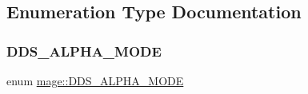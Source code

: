 \subsection{Enumeration Type Documentation}
\hypertarget{namespacemage_a0c586a2bad862f4858900ca121ca80c2}{}\label{namespacemage_a0c586a2bad862f4858900ca121ca80c2} 
\subsubsection{\texorpdfstring{D\+D\+S\+\_\+\+A\+L\+P\+H\+A\+\_\+\+M\+O\+DE}{DDS\_ALPHA\_MODE}}
{\footnotesize\ttfamily enum \hyperlink{namespacemage_a0c586a2bad862f4858900ca121ca80c2}{mage\+::\+D\+D\+S\+\_\+\+A\+L\+P\+H\+A\+\_\+\+M\+O\+DE}}

